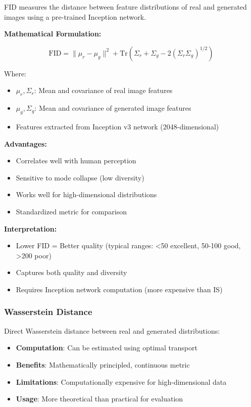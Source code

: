 \documentclass[conference,12pt]{IEEEtran}
\begin{document}
FID measures the distance between feature distributions of real and generated images using a pre-trained Inception network.

\textbf{Mathematical Formulation:}

\begin{equation}
    \text{FID} = \|\mu_r - \mu_g\|^2 + \text{Tr}(\Sigma_r + \Sigma_g - 2(\Sigma_r \Sigma_g)^{1/2})
\end{equation}

Where:
\begin{itemize}
    \item $\mu_r, \Sigma_r$: Mean and covariance of real image features
    \item $\mu_g, \Sigma_g$: Mean and covariance of generated image features
    \item Features extracted from Inception v3 network (2048-dimensional)
\end{itemize}

\textbf{Advantages:}
\begin{itemize}
    \item Correlates well with human perception
    \item Sensitive to mode collapse (low diversity)
    \item Works well for high-dimensional distributions
    \item Standardized metric for comparison
\end{itemize}

\textbf{Interpretation:}
\begin{itemize}
    \item Lower FID = Better quality (typical ranges: <50 excellent, 50-100 good, >200 poor)
    \item Captures both quality and diversity
    \item Requires Inception network computation (more expensive than IS)
\end{itemize}

\subsubsection{Wasserstein Distance}

Direct Wasserstein distance between real and generated distributions:

\begin{itemize}
    \item \textbf{Computation}: Can be estimated using optimal transport
    \item \textbf{Benefits}: Mathematically principled, continuous metric
    \item \textbf{Limitations}: Computationally expensive for high-dimensional data
    \item \textbf{Usage}: More theoretical than practical for evaluation
\end{itemize}
\end{document}
